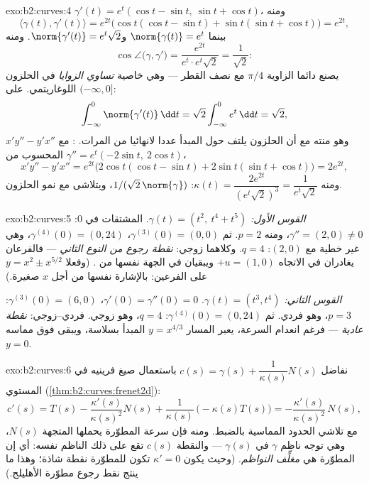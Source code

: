 \begin{solution}{exo:b2:curves:4}
$\gamma'(t) = e^t(\cos t - \sin t,\ \sin t + \cos t)$، ومنه
\[
\langle \gamma(t), \gamma'(t)\rangle = e^{2t}
\bigl(\cos t(\cos t - \sin t) + \sin t(\sin t + \cos t)\bigr)
= e^{2t},
\]
بينما $\norm{\gamma(t)} = e^t$ و$\norm{\gamma'(t)} =
e^t\sqrt 2$. ومنه
\[
\cos\angle\bigl(\gamma, \gamma'\bigr)
= \frac{e^{2t}}{e^t \cdot e^t\sqrt2} = \frac{1}{\sqrt2} :
\]
 يصنع دائما الزاوية $\pi/4$ مع نصف القطر --- وهي خاصية
\emph{تساوي الزوايا} في الحلزون اللوغاريتمي.  على $(-\infty, 0]$:
\[
\int_{-\infty}^0 \norm{\gamma'(t)}\,\dd t
= \sqrt2\int_{-\infty}^0 e^t\,\dd t = \sqrt 2 ,
\]
وهو منته مع أن الحلزون يلتف حول المبدأ عددا لانهائيا من المرات.
: مع $x'y'' - y'x''$ المحسوب من $\gamma'' =
e^t(-2\sin t,\ 2\cos t)$،
\[
x'y'' - y'x'' = e^{2t}\bigl(2\cos t(\cos t - \sin t)
+ 2\sin t(\sin t + \cos t)\bigr) = 2e^{2t},
\]
ومنه $\kappa(t) = \dfrac{2e^{2t}}{(e^t\sqrt2)^3} =
\dfrac{1}{e^t\sqrt2}$:  $1/(\sqrt2\,
\norm{\gamma})$، ويتلاشى مع نمو الحلزون.
\end{solution}

\begin{solution}{exo:b2:curves:5}
\emph{القوس الأول:} $\gamma(t) = (t^2,\ t^4 + t^5)$. المشتقات في $0$: $\gamma'' = (2, 0) \neq 0$، ومنه $p = 2$.
ثم $\gamma^{(3)}(0)
= (0, 0)$، $\gamma^{(4)}(0) = (0, 24)$، وهي غير خطية مع $(2,
0)$: $q = 4$. وكلاهما زوجي:
\emph{نقطة رجوع من النوع الثاني} --- فالفرعان يغادران في الاتجاه
$+u = (1,0)$ ويبقيان في الجهة نفسها من . (وفعلا $y = x^2 \pm x^{5/2}$ على الفرعين:
بالإشارة نفسها من أجل $x$ صغيرة.)

\emph{القوس الثاني:} $\gamma(t) = (t^3, t^4)$. $\gamma'(0) =
\gamma''(0) = 0$، $\gamma^{(3)}(0) = (6, 0)$: $p = 3$، وهو فردي. ثم
$\gamma^{(4)}(0) = (0, 24)$: $q = 4$، وهو زوجي. فردي--زوجي: \emph{نقطة عادية} --- فرغم
انعدام السرعة، يعبر المسار $y = x^{4/3}$ المبدأ بسلاسة، ويبقى فوق مماسه
$y = 0$.
\end{solution}

\begin{solution}{exo:b2:curves:6}
نفاضل $c(s) = \gamma(s) + \dfrac{1}{\kappa(s)}N(s)$ باستعمال صيغ فرينيه في المستوي (\cref{thm:b2:curves:frenet2d}):
\[
c'(s) = T(s) - \frac{\kappa'(s)}{\kappa(s)^2}N(s)
+ \frac{1}{\kappa(s)}\,\bigl(-\kappa(s)T(s)\bigr)
= -\frac{\kappa'(s)}{\kappa(s)^2}\,N(s) ,
\]
مع تلاشي الحدود المماسية بالضبط. ومنه فإن سرعة المطوّرة يحملها
المتجهة $N(s)$، وهي توجه ناظم $\gamma$ في $\gamma(s)$ --- والنقطة $c(s)$ تقع
على ذلك الناظم نفسه: أي إن المطوّرة هي \emph{مغلِّف النواظم}. (وحيث
يكون $\kappa' = 0$ تكون للمطوّرة نقطة شاذة؛ وهذا ما ينتج نقط رجوع مطوّرة
الأهليلج.)
\end{solution}

